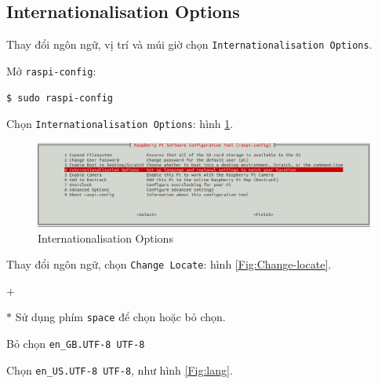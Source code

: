 \documentclass[12pt,a4paper]{article}
\begin{document}
\subsection{Internationalisation Options}
	Thay đổi ngôn ngữ, vị trí và múi giờ chọn \verb|Internationalisation Options|.
	\begin{list}{--}{}
		\item Mở \verb|raspi-config|:
			\begin{lstlisting}[language=bash]
$ sudo raspi-config
			\end{lstlisting}
		
		\item Chọn \verb|Internationalisation Options|: hình \ref{Fig:Internationalisation-Options}.
			\begin{figure}[!h]
				\begin{center}
					\includegraphics[scale=.3]{Internationalisation-Options.png} 
				\end{center}
				\caption{Internationalisation Options}\label{Fig:Internationalisation-Options}
				\end{figure}
				
		\item Thay đổi ngôn ngữ, chọn \verb|Change Locate|: hình \ref{Fig:Change-locate}. 
		\begin	{list}{+}{}
				\item[$\ast$] Sử dụng phím \verb|space| để chọn hoặc bỏ chọn.
				
				\item Bỏ chọn \verb|en_GB.UTF-8 UTF-8|
				
				\item Chọn \verb|en_US.UTF-8 UTF-8|, như hình \ref{Fig:lang}.
		\end{list}
		

\end{list}
\end{document}
